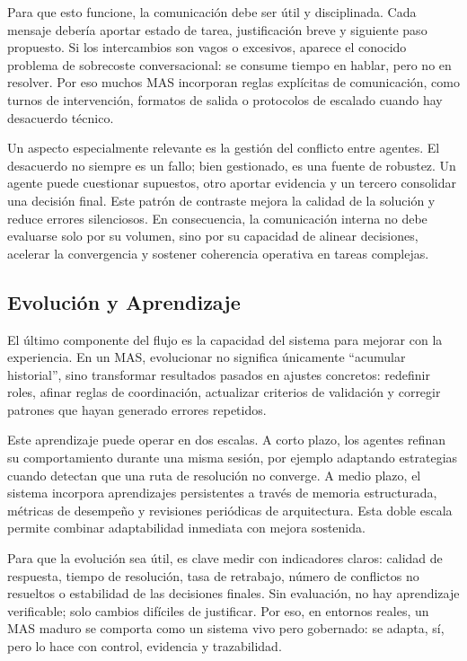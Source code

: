 \documentclass[12pt,a4paper]{article}
\begin{document}
Para que esto funcione, la comunicación debe ser útil y disciplinada. Cada mensaje debería aportar estado de tarea, justificación breve y siguiente paso propuesto. Si los intercambios son vagos o excesivos, aparece el conocido problema de sobrecoste conversacional: se consume tiempo en hablar, pero no en resolver. Por eso muchos MAS incorporan reglas explícitas de comunicación, como turnos de intervención, formatos de salida o protocolos de escalado cuando hay desacuerdo técnico.

Un aspecto especialmente relevante es la gestión del conflicto entre agentes. El desacuerdo no siempre es un fallo; bien gestionado, es una fuente de robustez. Un agente puede cuestionar supuestos, otro aportar evidencia y un tercero consolidar una decisión final. Este patrón de contraste mejora la calidad de la solución y reduce errores silenciosos. En consecuencia, la comunicación interna no debe evaluarse solo por su volumen, sino por su capacidad de alinear decisiones, acelerar la convergencia y sostener coherencia operativa en tareas complejas.
\subsection{Evolución y Aprendizaje}
El último componente del flujo es la capacidad del sistema para mejorar con la experiencia. En un MAS, evolucionar no significa únicamente ``acumular historial'', sino transformar resultados pasados en ajustes concretos: redefinir roles, afinar reglas de coordinación, actualizar criterios de validación y corregir patrones que hayan generado errores repetidos.

Este aprendizaje puede operar en dos escalas. A corto plazo, los agentes refinan su comportamiento durante una misma sesión, por ejemplo adaptando estrategias cuando detectan que una ruta de resolución no converge. A medio plazo, el sistema incorpora aprendizajes persistentes a través de memoria estructurada, métricas de desempeño y revisiones periódicas de arquitectura. Esta doble escala permite combinar adaptabilidad inmediata con mejora sostenida.

Para que la evolución sea útil, es clave medir con indicadores claros: calidad de respuesta, tiempo de resolución, tasa de retrabajo, número de conflictos no resueltos o estabilidad de las decisiones finales. Sin evaluación, no hay aprendizaje verificable; solo cambios difíciles de justificar. Por eso, en entornos reales, un MAS maduro se comporta como un sistema vivo pero gobernado: se adapta, sí, pero lo hace con control, evidencia y trazabilidad.
\end{document}
